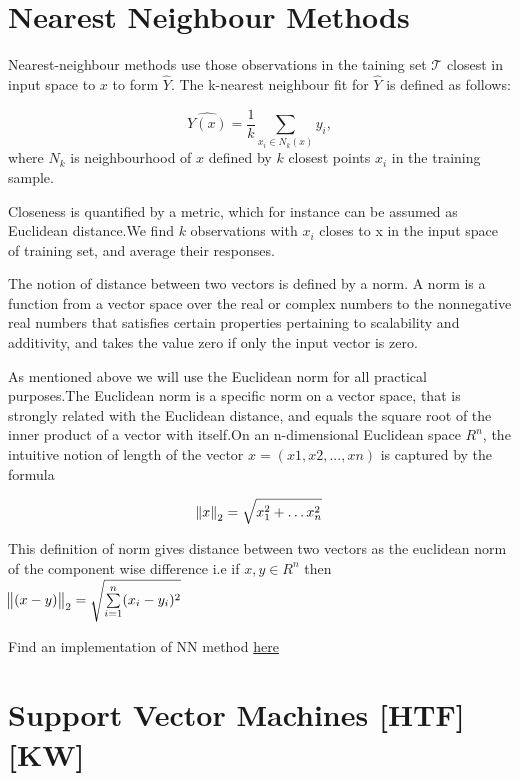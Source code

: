 \documentclass[12pt]{article}
\begin{document}
 
 
 
 
 \section{Nearest Neighbour Methods}
 
 Nearest-neighbour methods use those observations in the taining set $\mathcal{T}$ closest in input space to $x$ to form $\hat{Y}$.
 The k-nearest neighbour fit for $\hat{Y}$ is defined as follows:
 
 $$\hat{Y(x)} = \frac{1}{k}\sum_{x_{i} \in N_{k}(x)} y_{i},$$ where $N_{k}$ is neighbourhood of $x$ defined by $k$ closest points $x_{i}$ in the training sample.
 
 Closeness is quantified by a metric, which for instance can be assumed as Euclidean distance.We find $k$ observations with $x_{i}$ closes to x in the input space of training set, and average their responses.
 
 The notion of distance between two vectors is defined by a norm. A norm is a function from a vector space over the real or complex numbers to the nonnegative real numbers that satisfies certain properties pertaining to scalability and additivity, and takes the value zero if only the input vector is zero.
 
 As mentioned above we will use the Euclidean norm for all practical purposes.The Euclidean norm  is a specific norm on a vector space, that is strongly related with the Euclidean distance, and equals the square root of the inner product of a vector with itself.On an n-dimensional Euclidean space $ R^{n}$, the intuitive notion of length of the vector $x = (x1, x2, ..., xn)$ is captured by the formula
 
 $$\norm{x}_{2}= \sqrt{x_{1}^{2}+ \dots x_{n}^{2}}$$
 
 
This definition of norm gives distance between two vectors as the euclidean norm of the component wise difference i.e if $x, y \in R^{n}$ then \\ $ \norm{(x-y)}_{2} = \sqrt{\sum\limits_{i=1}^{n}(x_{i}-y_{i})^{2}} $
 
 \vspace{0.4 cm}
 Find an implementation of NN method \href{https://github.com/aswin16/ML-REPORT/blob/master/codes/NN_MNIST.ipynb}{here}
 
 
 
 
 
 \section{Support Vector Machines \tiny{[HTF][KW]}} 
 
\end{document}
